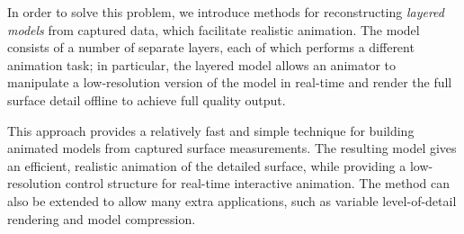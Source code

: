 In order to solve this problem, we introduce methods for reconstructing {\it layered models} from captured data, which facilitate realistic animation. The model consists of a number of separate layers, each of which performs a different animation task; in particular, the layered model allows an animator to manipulate a low-resolution version of the model in real-time and render the full surface detail offline to achieve full quality output.

This approach provides a relatively fast and simple technique for building animated models from captured surface measurements. The resulting model gives an efficient, realistic animation of the detailed surface, while providing a low-resolution control structure for real-time interactive animation. The method can also be extended to allow many extra applications, such as variable level-of-detail rendering and model compression.

